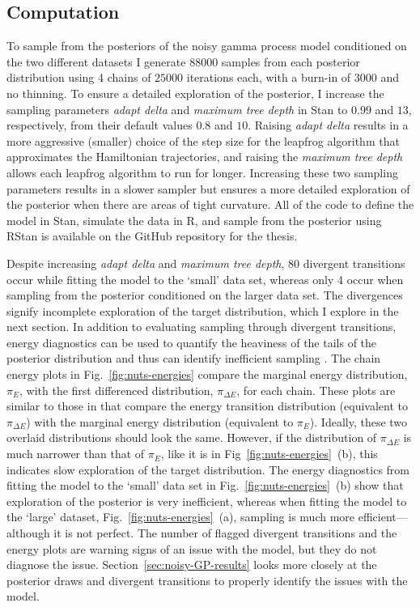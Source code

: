 \subsection{Computation}

To sample from the posteriors of the noisy gamma process model conditioned on the two different datasets I generate $88000$ samples from each posterior distribution using 4 chains of $25000$ iterations each, with a burn-in of $3000$ and no thinning. To ensure a detailed exploration of the posterior, I increase the sampling parameters \textit{adapt delta} and \textit{maximum tree depth} in Stan to $0.99$ and $13$, respectively, from their default values $0.8$ and $10$. Raising \textit{adapt delta} results in a more aggressive (smaller) choice of the step size for the leapfrog algorithm that approximates the Hamiltonian trajectories, and raising the \textit{maximum tree depth} allows each leapfrog algorithm to run for longer. Increasing these two sampling parameters results in a slower sampler but ensures a more detailed exploration of the posterior when there are areas of tight curvature. All of the code to define the model in Stan, simulate the data in R, and sample from the posterior using RStan is available on the GitHub repository for the thesis.

Despite increasing \textit{adapt delta} and \textit{maximum tree depth}, 80 divergent transitions occur while fitting the model to the `small' data set, whereas only 4 occur when sampling from the posterior conditioned on the larger data set. The divergences signify incomplete exploration of the target distribution, which I explore in the next section. In addition to evaluating sampling through divergent transitions, energy diagnostics can be used to quantify the heaviness of the tails of the posterior distribution and thus can identify inefficient sampling \citep{bayesplot}. The chain energy plots in Fig.~\ref{fig:nuts-energies} compare the marginal energy distribution, $\pi_E$, with the first differenced distribution, $\pi_{\Delta E}$, for each chain. These plots are similar to those in \citet{betancourt_2017} that compare the energy transition distribution (equivalent to $\pi_{\Delta E}$) with the marginal energy distribution (equivalent to $\pi_E$). Ideally, these two overlaid distributions should look the same. However, if the distribution of $\pi_{\Delta E}$ is much narrower than that of $\pi_E$, like it is in Fig~\ref{fig:nuts-energies}~(b), this indicates slow exploration of the target distribution. The energy diagnostics from fitting the model to the `small' data set in Fig.~\ref{fig:nuts-energies}~(b) show that exploration of the posterior is very inefficient, whereas when fitting the model to the `large' dataset, Fig.~\ref{fig:nuts-energies}~(a), sampling is much more efficient---although it is not perfect. The number of flagged divergent transitions and the energy plots are warning signs of an issue with the model, but they do not diagnose the issue. Section~\ref{sec:noisy-GP-results} looks more closely at the posterior draws and divergent transitions to properly identify the issues with the model.

